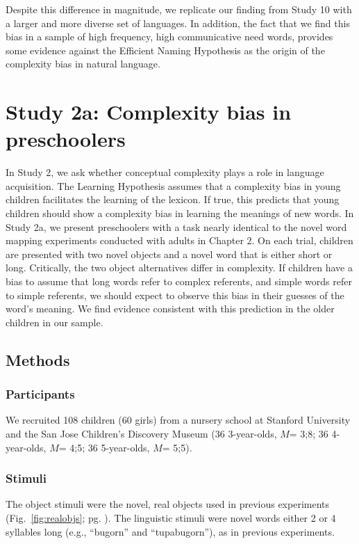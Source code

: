 Despite this difference in magnitude, we replicate our finding from Study 10 with a larger and more diverse set of languages. In addition, the fact that we find this bias in a sample of high frequency, high communicative need words, provides some evidence against the Efficient Naming Hypothesis as the origin of the complexity bias in natural language.

\section{Study 2a: Complexity bias in preschoolers }

In Study 2, we ask whether conceptual complexity  plays a role in language acquisition. The Learning Hypothesis assumes that a complexity bias in young children facilitates the learning of the lexicon. If true, this predicts that young children should show a complexity bias in learning the meanings of new words. In Study 2a, we present preschoolers with a task nearly identical to the novel word mapping experiments conducted with adults in Chapter 2. On each trial, children are presented with two novel objects and a novel word that is either short or long. Critically, the two object alternatives differ in complexity. If children have a bias to assume that long words refer to complex referents, and simple words refer to simple referents, we should expect to observe this bias in their guesses of the word's meaning.  We find evidence consistent with this prediction in the older children in our sample. 

\subsection{Methods}
\subsubsection{Participants} We recruited 108 children (60 girls) from a nursery school at Stanford University and the San Jose Children's Discovery Museum (36 3-year-olds, $M$= 3;8; 36 4-year-olds, $M$= 4;5; 36 5-year-olds, $M$= 5;5). 
\subsubsection{Stimuli} 
The object stimuli were the novel, real objects used in previous experiments (Fig.\ \ref{fig:realobjs};  pg. \pageref{novelrealobjs}). The linguistic stimuli were novel words either 2 or 4 syllables long (e.g., ``bugorn'' and ``tupabugorn''), as in previous experiments.

